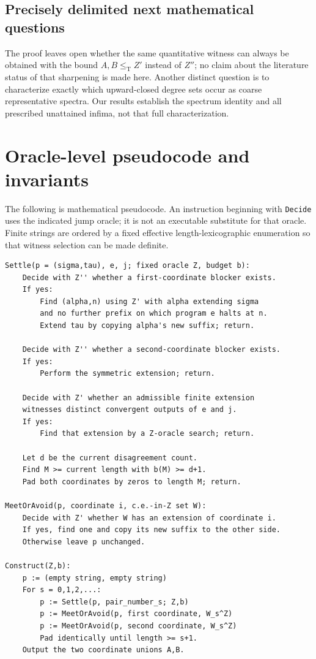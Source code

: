 \documentclass[11pt,a4paper]{article}
\newcommand{\leT}{\leq_{\mathrm T}}
\theoremstyle{definition}\newtheorem{definition}[theorem]{Definition}
\theoremstyle{remark}\newtheorem{remark}[theorem]{Remark}
\begin{document}
\subsection{Precisely delimited next mathematical questions}
The proof leaves open whether the same quantitative witness can always be obtained with the bound $A,B\leT Z'$ instead of $Z''$; no claim about the literature status of that sharpening is made here. Another distinct question is to characterize exactly which upward-closed degree sets occur as coarse representative spectra. Our results establish the spectrum identity and all prescribed unattained infima, not that full characterization.

\clearpage
\appendix
\section{Oracle-level pseudocode and invariants}
\label{app:algorithm}

The following is mathematical pseudocode. An instruction beginning with \texttt{Decide} uses the indicated jump oracle; it is not an executable substitute for that oracle. Finite strings are ordered by a fixed effective length-lexicographic enumeration so that witness selection can be made definite.

\begin{lstlisting}
Settle(p = (sigma,tau), e, j; fixed oracle Z, budget b):
    Decide with Z'' whether a first-coordinate blocker exists.
    If yes:
        Find (alpha,n) using Z' with alpha extending sigma
        and no further prefix on which program e halts at n.
        Extend tau by copying alpha's new suffix; return.

    Decide with Z'' whether a second-coordinate blocker exists.
    If yes:
        Perform the symmetric extension; return.

    Decide with Z' whether an admissible finite extension
    witnesses distinct convergent outputs of e and j.
    If yes:
        Find that extension by a Z-oracle search; return.

    Let d be the current disagreement count.
    Find M >= current length with b(M) >= d+1.
    Pad both coordinates by zeros to length M; return.

MeetOrAvoid(p, coordinate i, c.e.-in-Z set W):
    Decide with Z' whether W has an extension of coordinate i.
    If yes, find one and copy its new suffix to the other side.
    Otherwise leave p unchanged.

Construct(Z,b):
    p := (empty string, empty string)
    For s = 0,1,2,...:
        p := Settle(p, pair_number_s; Z,b)
        p := MeetOrAvoid(p, first coordinate, W_s^Z)
        p := MeetOrAvoid(p, second coordinate, W_s^Z)
        Pad identically until length >= s+1.
    Output the two coordinate unions A,B.
\end{lstlisting}
\end{document}
